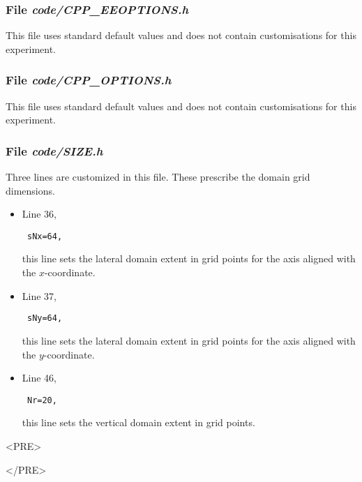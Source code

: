 \subsubsection{File {\it code/CPP\_EEOPTIONS.h}}
\label{www:tutorials}

This file uses standard default values and does not contain
customisations for this experiment.

\subsubsection{File {\it code/CPP\_OPTIONS.h}}
\label{www:tutorials}

This file uses standard default values and does not contain
customisations for this experiment.

\subsubsection{File {\it code/SIZE.h}}
\label{www:tutorials}

Three lines are customized in this file. These prescribe the domain grid dimensions.
\begin{itemize}

\item Line 36, 
\begin{verbatim} sNx=64, \end{verbatim} this line sets
the lateral domain extent in grid points for the
axis aligned with the $x$-coordinate.

\item Line 37, 
\begin{verbatim} sNy=64, \end{verbatim} this line sets
the lateral domain extent in grid points for the
axis aligned with the $y$-coordinate.

\item Line 46, 
\begin{verbatim} Nr=20,   \end{verbatim} this line sets
the vertical domain extent in grid points.

\end{itemize}

\begin{rawhtml}<PRE>\end{rawhtml}
\begin{small}

\end{small}
\begin{rawhtml}</PRE>\end{rawhtml}

